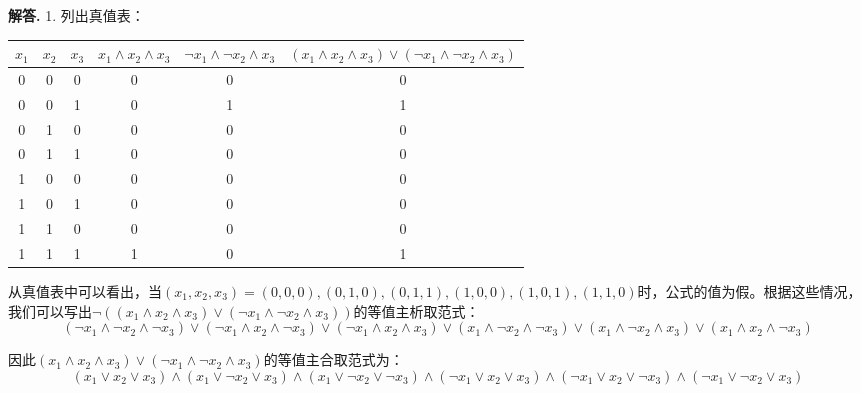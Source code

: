 \documentclass[12pt, a4paper, oneside]{ctexart}
\newenvironment{solution}{\par\noindent\textbf{解答. }}{\par}
\begin{document}
\begin{solution}
1. 列出真值表：
\begin{center}
    \begin{tabular}{c|c|c|c|c|c}
        $x_1$ & $x_2$ & $x_3$ & $x_1 \land x_2 \land x_3$ & $\lnot x_1 \land \lnot x_2 \land x_3$ & $(x_1 \land x_2 \land x_3) \lor (\lnot x_1 \land \lnot x_2 \land x_3)$  \\
        \hline
        0 & 0 & 0 & 0 & 0 & 0  \\
        0 & 0 & 1 & 0 & 1 & 1  \\
        0 & 1 & 0 & 0 & 0 & 0  \\
        0 & 1 & 1 & 0 & 0 & 0  \\
        1 & 0 & 0 & 0 & 0 & 0  \\
        1 & 0 & 1 & 0 & 0 & 0  \\
        1 & 1 & 0 & 0 & 0 & 0  \\
        1 & 1 & 1 & 1 & 0 & 1  \\
    \end{tabular}
\end{center}
从真值表中可以看出，当$(x_1, x_2, x_3) = (0, 0, 0), (0, 1, 0), (0, 1, 1), (1, 0, 0), (1, 0, 1), (1, 1, 0)$时，公式的值为假。根据这些情况，我们可以写出$\lnot((x_1 \land x_2 \land x_3) \lor (\lnot x_1 \land \lnot x_2 \land x_3))$的等值主析取范式：
\[(\lnot x_1 \land \lnot x_2 \land \lnot x_3) \lor (\lnot x_1 \land x_2 \land \lnot x_3) \lor (\lnot x_1 \land x_2 \land x_3) \lor (x_1 \land \lnot x_2 \land \lnot x_3) \lor (x_1 \land \lnot x_2 \land x_3) \lor (x_1 \land x_2 \land \lnot x_3)\]

因此$(x_1 \land x_2 \land x_3) \lor (\lnot x_1 \land \lnot x_2 \land x_3)$的等值主合取范式为：
\[(x_1 \lor x_2 \lor x_3) \land (x_1 \lor \lnot x_2 \lor x_3) \land (x_1 \lor \lnot x_2 \lor \lnot x_3) \land (\lnot x_1 \lor x_2 \lor x_3) \land (\lnot x_1 \lor x_2 \lor \lnot x_3) \land (\lnot x_1 \lor \lnot x_2 \lor x_3)\]


\end{solution}
\end{document}
